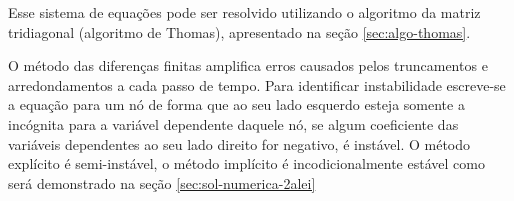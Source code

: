 Esse sistema de equações pode ser resolvido utilizando o algoritmo da matriz tridiagonal (algoritmo de Thomas), apresentado na seção \ref{sec:algo-thomas}.

O método das diferenças finitas amplifica erros causados pelos truncamentos e arredondamentos a cada passo de tempo. Para identificar instabilidade escreve-se a equação para um nó de forma que ao seu lado esquerdo esteja somente a incógnita para a variável dependente daquele nó, se algum coeficiente das variáveis dependentes ao seu lado direito for negativo, é instável. O método explícito é semi-instável, o método implícito é incodicionalmente estável como será demonstrado na seção \ref{sec:sol-numerica-2alei} 